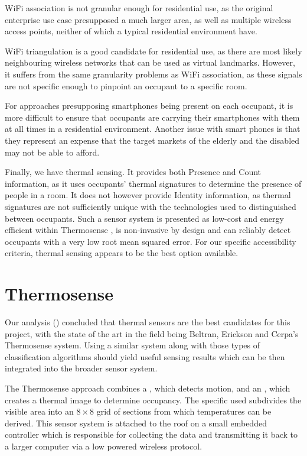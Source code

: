 \documentclass[../thesis/thesis.tex]{subfiles}
\begin{document}
WiFi association is not granular enough for residential use, as the original enterprise use case presupposed a much larger area, as well as multiple wireless access points, neither of which a typical residential environment have.

WiFi triangulation is a good candidate for residential use, as there are most likely neighbouring wireless networks that can be used as virtual landmarks. However, it suffers from the same granularity problems as WiFi association, as these signals are not specific enough to pinpoint an occupant to a specific room.

For approaches presupposing smartphones being present on each occupant, it is more difficult to ensure that occupants are carrying their smartphones with them at all times in a residential environment.  Another issue with smart phones is that they represent an expense that the target markets of the elderly and the disabled may not be able to afford.

Finally, we have thermal sensing. It provides both Presence and Count information, as it uses occupants' thermal signatures to determine the presence of people in a room. It does not however provide Identity information, as thermal signatures are not sufficiently unique with the technologies used to distinguished between occupants. Such a sensor system is presented as low-cost and energy efficient within Thermosense \cite{beltran2013thermosense}, is non-invasive by design and can reliably detect occupants with a very low root mean squared error. For our specific accessibility criteria, thermal sensing appears to be the best option available.

\section{Thermosense}
\label{sec:litreview:thermalsensors}
Our analysis () concluded that thermal sensors are the best candidates for this project, with the state of the art in the field being Beltran, Erickson and Cerpa's Thermosense system. Using a similar \iar system along with those types of classification algorithms should yield useful sensing results which can be then integrated into the broader sensor system.

The Thermosense approach combines a \pir, which detects motion, and an \iar, which creates a thermal image to determine occupancy. The specific \iar used subdivides the visible area into an $8\times8$ grid of sections from which temperatures can be derived. This sensor system is attached to the roof on a small embedded controller which is responsible for collecting the data and transmitting it back to a larger computer via a low powered wireless protocol. 
\end{document}
